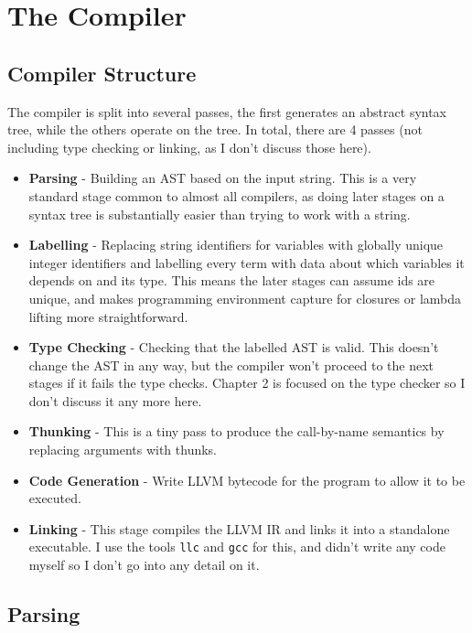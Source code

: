 \section{The Compiler}

\subsection{Compiler Structure}

The compiler is split into several passes, the first generates an abstract syntax tree, while the others
operate on the tree.
In total, there are 4 passes (not including type checking or linking, as I don't discuss those here).

\begin{itemize}
    \item \textbf{Parsing} -
    Building an AST based on the input string.
    This is a very standard stage common to almost all compilers, as doing later stages on a syntax tree
    is substantially easier than trying to work with a string.
    \item \textbf{Labelling} -
    Replacing string identifiers for variables with globally unique integer identifiers and
    labelling every term with data about which variables it depends on and its type.
    This means the later stages can assume ids are unique, and makes programming environment capture for
    closures or lambda lifting more straightforward.
    \item \textbf{Type Checking} -
    Checking that the labelled AST is valid.
    This doesn't change the AST in any way, but the compiler won't proceed to the next stages if it fails the
    type checks.
    Chapter 2 is focused on the type checker so I don't discuss it any more here.
    \item \textbf{Thunking} -
    This is a tiny pass to produce the call-by-name semantics by replacing arguments with thunks.
    \item \textbf{Code Generation} -
    Write LLVM bytecode for the program to allow it to be executed.
    \item \textbf{Linking} -
    This stage compiles the LLVM IR and links it into a standalone executable.
    I use the tools \texttt{llc} and \texttt{gcc} for this, and didn't write any code myself so I don't go into
    any detail on it.
\end{itemize}

\subsection{Parsing}

